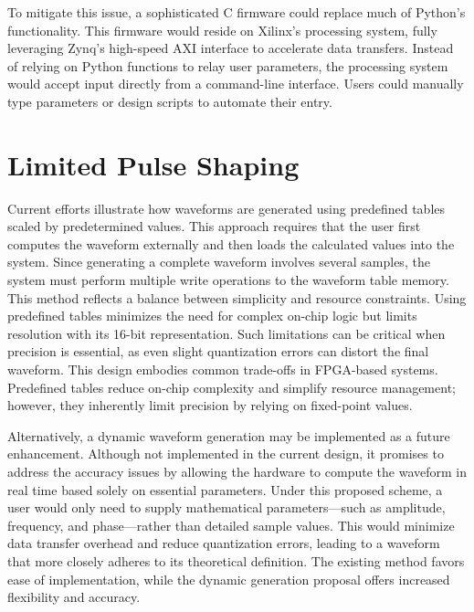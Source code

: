 To mitigate this issue, a sophisticated C firmware could replace much of Python's functionality. This firmware would reside on Xilinx's processing system, fully leveraging Zynq's high-speed AXI interface to accelerate data transfers. Instead of relying on Python functions to relay user parameters, the processing system would accept input directly from a command-line interface. Users could manually type parameters or design scripts to automate their entry.


\section{Limited Pulse Shaping}

Current efforts illustrate how waveforms are generated using predefined tables scaled by predetermined values. This approach requires that the user first computes the waveform externally and then loads the calculated values into the system. Since generating a complete waveform involves several samples, the system must perform multiple write operations to the waveform table memory. This method reflects a balance between simplicity and resource constraints. Using predefined tables minimizes the need for complex on-chip logic but limits resolution with its 16-bit representation. Such limitations can be critical when precision is essential, as even slight quantization errors can distort the final waveform. This design embodies common trade-offs in FPGA-based systems. Predefined tables reduce on-chip complexity and simplify resource management; however, they inherently limit precision by relying on fixed-point values.

Alternatively, a dynamic waveform generation may be implemented as a future enhancement. Although not implemented in the current design, it promises to address the accuracy issues by allowing the hardware to compute the waveform in real time based solely on essential parameters. Under this proposed scheme, a user would only need to supply mathematical parameters—such as amplitude, frequency, and phase—rather than detailed sample values. This would minimize data transfer overhead and reduce quantization errors, leading to a waveform that more closely adheres to its theoretical definition. The existing method favors ease of implementation, while the dynamic generation proposal offers increased flexibility and accuracy.

